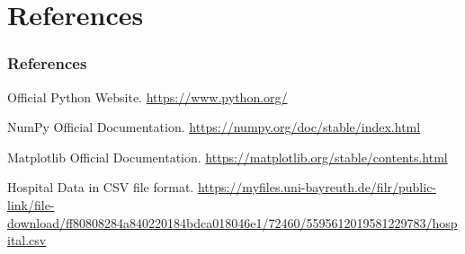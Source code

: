 \documentclass{beamer}
\begin{document}
\section{References}
\begin{frame}
\frametitle{References}
\begin{thebibliography}{9}
Official Python Website.
\url{https://www.python.org/}

NumPy Official Documentation.
\url{https://numpy.org/doc/stable/index.html}

Matplotlib Official Documentation.
\url{https://matplotlib.org/stable/contents.html}

Hospital Data in CSV file format.
\url{https://myfiles.uni-bayreuth.de/filr/public-link/file-download/ff80808284a840220184bdca018046e1/72460/5595612019581229783/hospital.csv}
\end{thebibliography}
\end{frame}
\end{document}
